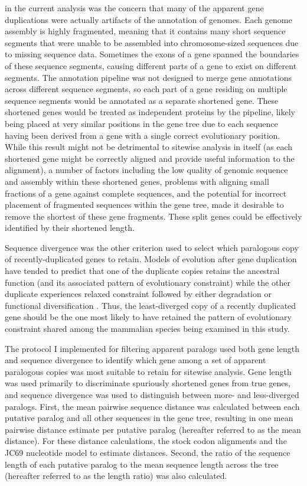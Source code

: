 in the current analysis was the concern that many of the apparent gene
duplications were actually artifacts of the annotation of \lcv
genomes. Each \lcv genome assembly is highly fragmented, meaning that
it contains many short sequence segments that were unable to be
assembled into chromosome-sized sequences due to missing sequence
data. Sometimes the exons of a gene spanned the boundaries of these
sequence segments, causing different parts of a gene to exist on
different segments. The \ens annotation pipeline was not designed to
merge gene annotations across different sequence segments, so each
part of a gene residing on multiple sequence segments would be
annotated as a separate shortened gene. These shortened genes would be
treated as independent proteins by the \cmp pipeline, likely being
placed at very similar positions in the gene tree due to each sequence
having been derived from a gene with a single correct evolutionary
position. While this result might not be detrimental to sitewise
analysis in itself (as each shortened gene might be correctly aligned
and provide useful information to the alignment), a number of factors
including the low quality of genomic sequence and assembly within
these shortened genes, problems with aligning small fractions of a
gene against complete sequences, and the potential for incorrect
placement of fragmented sequences within the gene tree, made it
desirable to remove the shortest of these gene fragments. These split
genes could be effectively identified by their shortened length.

Sequence divergence was the other criterion used to select which
paralogous copy of recently-duplicated genes to retain. Models of
evolution after gene duplication have tended to predict that one of the
duplicate copies retains the ancestral function (and its associated
pattern of evolutionary constraint) while the other duplicate
experiences relaxed constraint followed by either degradation or
functional diversification \citep{Han2009}. Thus, the least-diverged
copy of a recently duplicated gene should be the one most likely to
have retained the pattern of evolutionary constraint shared among the
mammalian species being examined in this study.

The protocol I implemented for filtering apparent paralogs used both
gene length and sequence divergence to identify which gene among a set
of apparent paralogous copies was most suitable to retain for sitewise
analysis. Gene length was used primarily to discriminate spuriously
shortened genes from true genes, and sequence divergence was used to
distinguish between more- and less-diverged paralogs. First, the mean
pairwise sequence distance was calculated between each putative
paralog and all other sequences in the gene tree, resulting in one
mean pairwise distance estimate per putative paralog (hereafter
referred to as the mean distance). For these distance calculations,
the stock \cmp codon alignments and the JC69 nucleotide model to
estimate distances. Second, the ratio of the sequence length of each
putative paralog to the mean sequence length across the tree
(hereafter referred to as the length ratio) was also calculated.

